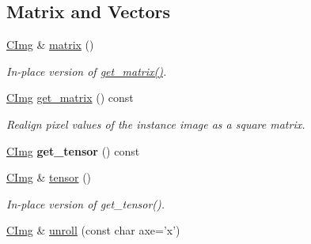 \subsection*{Matrix and Vectors}
\label{_amgrp78056aad06b08c47daecb8a5c298d8f7}
 \begin{DoxyCompactItemize}
\item 
\hypertarget{structcimg__library_1_1_c_img_accacb7441cbe8f2805b2b8edc118231e}{
\hyperlink{structcimg__library_1_1_c_img}{CImg} \& \hyperlink{structcimg__library_1_1_c_img_accacb7441cbe8f2805b2b8edc118231e}{matrix} ()}
\label{structcimg__library_1_1_c_img_accacb7441cbe8f2805b2b8edc118231e}

\begin{DoxyCompactList}\small\item\em In-\/place version of \hyperlink{structcimg__library_1_1_c_img_abd5cc0f26ba41fed5b0f015206781f28}{get\_\-matrix()}. \item\end{DoxyCompactList}\item 
\hypertarget{structcimg__library_1_1_c_img_abd5cc0f26ba41fed5b0f015206781f28}{
\hyperlink{structcimg__library_1_1_c_img}{CImg} \hyperlink{structcimg__library_1_1_c_img_abd5cc0f26ba41fed5b0f015206781f28}{get\_\-matrix} () const }
\label{structcimg__library_1_1_c_img_abd5cc0f26ba41fed5b0f015206781f28}

\begin{DoxyCompactList}\small\item\em Realign pixel values of the instance image as a square matrix. \item\end{DoxyCompactList}\item 
\hypertarget{structcimg__library_1_1_c_img_a4133a5277211935ee2441440024ac7dd}{
\hyperlink{structcimg__library_1_1_c_img}{CImg} {\bfseries get\_\-tensor} () const }
\label{structcimg__library_1_1_c_img_a4133a5277211935ee2441440024ac7dd}

\item 
\hypertarget{structcimg__library_1_1_c_img_acca65d50da14f3c9cf787370f97d7046}{
\hyperlink{structcimg__library_1_1_c_img}{CImg} \& \hyperlink{structcimg__library_1_1_c_img_acca65d50da14f3c9cf787370f97d7046}{tensor} ()}
\label{structcimg__library_1_1_c_img_acca65d50da14f3c9cf787370f97d7046}

\begin{DoxyCompactList}\small\item\em In-\/place version of get\_\-tensor(). \item\end{DoxyCompactList}\item 
\hypertarget{structcimg__library_1_1_c_img_a4fe05a8bfe2fd0404456c21b6e43f01c}{
\hyperlink{structcimg__library_1_1_c_img}{CImg} \& \hyperlink{structcimg__library_1_1_c_img_a4fe05a8bfe2fd0404456c21b6e43f01c}{unroll} (const char axe='x')}
\label{structcimg__library_1_1_c_img_a4fe05a8bfe2fd0404456c21b6e43f01c}


\end{DoxyCompactItemize}
